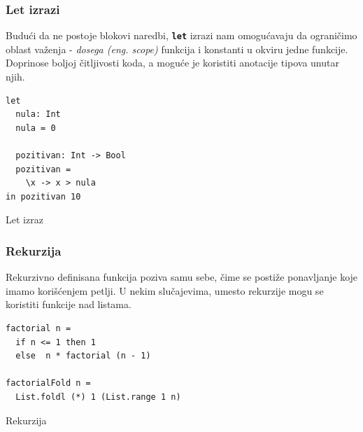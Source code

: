 \documentclass[12pt,oneside]{memoir}
\begin{document}
\subsubsection{Let izrazi}
Budući da ne postoje blokovi naredbi, \texttt{\textbf{let}} izrazi nam omogućavaju da 
ograničimo oblast važenja - \emph{ dosega (eng. scope)} funkcija i konstanti u okviru
jedne funkcije. Doprinose boljoj čitljivosti koda, a moguće je koristiti anotacije tipova
unutar njih.
\begin{listing}[h]
\begin{verbatim}
let
  nula: Int
  nula = 0
  
  pozitivan: Int -> Bool
  pozitivan =
    \x -> x > nula
in pozitivan 10
\end{verbatim}
\caption{Let izraz}
\end{listing}
\subsubsection{Rekurzija}
Rekurzivno definisana funkcija poziva samu sebe, čime se postiže ponavljanje koje imamo
korišćenjem petlji. U nekim slučajevima, umesto rekurzije mogu se koristiti funkcije nad
listama.
\begin{listing}[h]
\begin{verbatim}
factorial n = 
  if n <= 1 then 1 
  else  n * factorial (n - 1)

factorialFold n = 
  List.foldl (*) 1 (List.range 1 n) 
\end{verbatim}
\caption{Rekurzija}
\end{listing}
\end{document}
